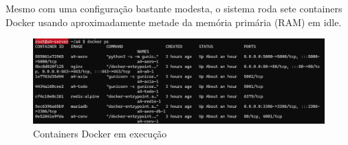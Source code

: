 Mesmo com uma configuração bastante modesta, o sistema roda sete containers Docker usando 
aproximadamente metade da memória primária (RAM) em idle.

\begin{figure}[ht]
    \begin{center}
    \includegraphics[width=400pt]{img/containers.png}
    \caption{Containers Docker em execução}
    \label{fig:containers}
    \end{center}
\end{figure}



